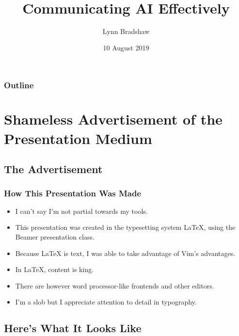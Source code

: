 \documentclass[10pt]{beamer}
\title{Communicating AI Effectively}
\author{Lynn Bradshaw}
\date{10 August 2019}
\begin{document}
  \begin{frame}
    \maketitle
  \end{frame}

  \begin{frame}
    \frametitle{Outline}
  \end{frame}

  \section{Shameless Advertisement of the Presentation Medium}

  \subsection{The Advertisement}

  \begin{frame}
    \frametitle{How This Presentation Was Made}
    \begin{itemize}
      \item I can't say I'm not partial towards my tools.
      \pause
      \item This presentation was created in the typesetting system \LaTeX,
        using the Beamer presentation class.
      \pause
      \item Because \LaTeX{} is text, I was able to take advantage of Vim's
        advantages.
      \pause
      \item In \LaTeX, content is king.
      \pause
      \item There are however word processor-like frontends and other editors.
      \pause
      \item I'm a slob but I appreciate attention to detail in typography.
    \end{itemize}
  \end{frame}

  \subsection{Here's What It Looks Like}
\end{document}
